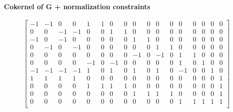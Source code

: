 \begin{frame}
\begin{block}{\textbf{Cokernel of $\mathbf{G}$ + normalization constraints}}
\begin{tiny}
\begin{equation*}\label{eq:eqmat}
\begin{aligned}
\begin{bmatrix}
  -1 & -1 & 0 & 0 & 1 & 1 & 0 & 0 & 0 & 0 & 0 & 0 & 0 & 0 & 0 & 0 & 0\\
  0 & 0 & -1 & -1 & 0 & 0 & 1 & 1 & 0 & 0 & 0 & 0 & 0 & 0 & 0 & 0 & 0\\
  -1 & 0 & -1 & 0 & 0 & 0 & 0 & 0 & 1 & 1 & 0 & 0 & 0 & 0 & 0 & 0 & 0\\
  0 & -1 & 0 & -1 & 0 & 0 & 0 & 0 & 0 & 0 & 1 & 1 & 0 & 0 & 0 & 0 & 0\\
  0 & 0 & 0 & 0 & 0 & 0 & 0 & 0 & -1 & 0 & -1 & 0 & 1 & 1 & 0 & 0 & 0\\
  0 & 0 & 0 & 0 & -1 & 0 & -1 & 0 & 0 & 0 & 0 & 0 & 1 & 0 & 1 & 0 & 0\\
  -1 & -1 & -1 & -1 & 1 & 0 & 1 & 0 & 1 & 0 & 1 & 0 & -1 & 0 & 0 & 1 & 0\\
  1 & 1 & 1 & 1 & 0 & 0 & 0 & 0 & 0 & 0 & 0 & 0 & 0 & 0 & 0 & 0 & 1\\
  0 & 0 & 0 & 0 & 1 & 1 & 1 & 1 & 0 & 0 & 0 & 0 & 0 & 0 & 0 & 0 & 1\\
  0 & 0 & 0 & 0 & 0 & 0 & 0 & 0 & 1 & 1 & 1 & 1 & 0 & 0 & 0 & 0 & 1\\
  0 & 0 & 0 & 0 & 0 & 0 & 0 & 0 & 0 & 0 & 0 & 0 & 1 & 1 & 1 & 1 & 1\\
\end{bmatrix}
\end{aligned}
\end{equation*}
\end{tiny}
\end{block}
\end{frame}
